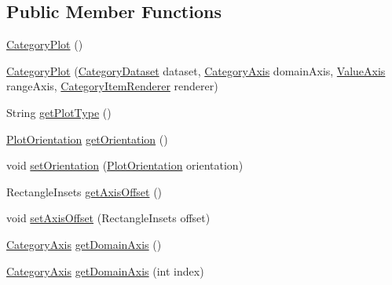 \subsection*{Public Member Functions}
\begin{DoxyCompactItemize}
\item 
\mbox{\hyperlink{classorg_1_1jfree_1_1chart_1_1plot_1_1_category_plot_a4a33812eca739bb6a825010f98da8e66}{Category\+Plot}} ()
\item 
\mbox{\hyperlink{classorg_1_1jfree_1_1chart_1_1plot_1_1_category_plot_a74083ebd29e450b1edbd9facd2da9e77}{Category\+Plot}} (\mbox{\hyperlink{interfaceorg_1_1jfree_1_1data_1_1category_1_1_category_dataset}{Category\+Dataset}} dataset, \mbox{\hyperlink{classorg_1_1jfree_1_1chart_1_1axis_1_1_category_axis}{Category\+Axis}} domain\+Axis, \mbox{\hyperlink{classorg_1_1jfree_1_1chart_1_1axis_1_1_value_axis}{Value\+Axis}} range\+Axis, \mbox{\hyperlink{interfaceorg_1_1jfree_1_1chart_1_1renderer_1_1category_1_1_category_item_renderer}{Category\+Item\+Renderer}} renderer)
\item 
String \mbox{\hyperlink{classorg_1_1jfree_1_1chart_1_1plot_1_1_category_plot_af0531c069575199b5df486ffd161d851}{get\+Plot\+Type}} ()
\item 
\mbox{\hyperlink{classorg_1_1jfree_1_1chart_1_1plot_1_1_plot_orientation}{Plot\+Orientation}} \mbox{\hyperlink{classorg_1_1jfree_1_1chart_1_1plot_1_1_category_plot_ab765cf8f5fe1dcf554b1a223bbe2d158}{get\+Orientation}} ()
\item 
void \mbox{\hyperlink{classorg_1_1jfree_1_1chart_1_1plot_1_1_category_plot_a82408e08765664dc74ebd2852d91dfaf}{set\+Orientation}} (\mbox{\hyperlink{classorg_1_1jfree_1_1chart_1_1plot_1_1_plot_orientation}{Plot\+Orientation}} orientation)
\item 
Rectangle\+Insets \mbox{\hyperlink{classorg_1_1jfree_1_1chart_1_1plot_1_1_category_plot_ad556bbd20fb3657e4ca0f9a58b2cc105}{get\+Axis\+Offset}} ()
\item 
void \mbox{\hyperlink{classorg_1_1jfree_1_1chart_1_1plot_1_1_category_plot_a2300f6317ee73cef6e46a90680af8d5a}{set\+Axis\+Offset}} (Rectangle\+Insets offset)
\item 
\mbox{\hyperlink{classorg_1_1jfree_1_1chart_1_1axis_1_1_category_axis}{Category\+Axis}} \mbox{\hyperlink{classorg_1_1jfree_1_1chart_1_1plot_1_1_category_plot_a18e5a481aee2fe569efaf4bc8abecd17}{get\+Domain\+Axis}} ()
\item 
\mbox{\hyperlink{classorg_1_1jfree_1_1chart_1_1axis_1_1_category_axis}{Category\+Axis}} \mbox{\hyperlink{classorg_1_1jfree_1_1chart_1_1plot_1_1_category_plot_ab1dc3f8f848b309404d1a4ca963b11da}{get\+Domain\+Axis}} (int index)

\end{DoxyCompactItemize}
